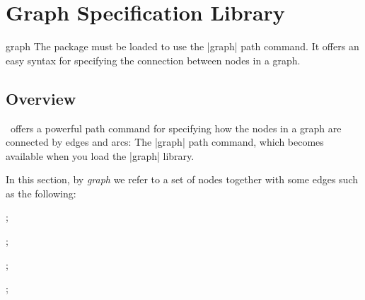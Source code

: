 %
%
%


\section{Graph Specification Library}
\label{section-library-graphs}

\begin{tikzlibrary}{graph}
  The package must be loaded to use the |graph| path command. It
  offers an easy syntax for specifying the connection between nodes in
  a graph. 
\end{tikzlibrary}


\subsection{Overview}

\tikzname\ offers a powerful path command for specifying how the nodes
in a graph are connected by edges and arcs: The |graph| path
command, which becomes available when you load the |graph| library.

In this section, by \emph{graph} we refer to a set of nodes together
with some edges such as the following:

\begin{codeexample}[]
\tikz {};
\end{codeexample}

\begin{codeexample}[]
\tikz
  ;
\end{codeexample}

\begin{codeexample}[]
\tikz
  ;
\end{codeexample}


\begin{codeexample}[]
\tikz [x=8mm, y=6mm, font=\footnotesize, circle]
  ;
\end{codeexample}

